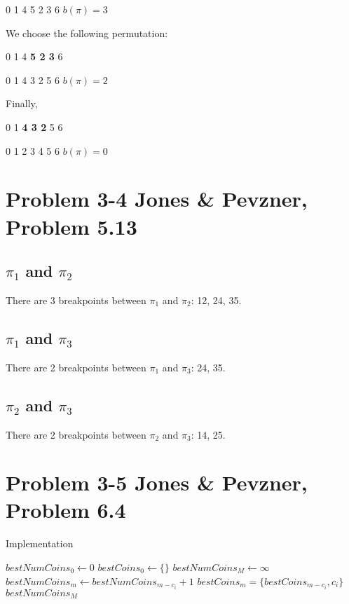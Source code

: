 \documentclass{article}
\begin{document}
\begin{center}
0 1 4 5 2 3 6 $b(\pi) = 3$
\end{center}

We choose the following permutation:

\begin{center}
0 1 4 \textbf{5 2 3} 6

0 1 4 3 2 5 6 $b(\pi) = 2$
\end{center}

Finally,

\begin{center}
0 1 \textbf{4 3 2} 5 6

0 1 2 3 4 5 6 $b(\pi) = 0$
\end{center}

\section*{Problem 3-4 Jones \& Pevzner, Problem 5.13}

\subsection*{$\pi_1$ and $\pi_2$}

There are 3 breakpoints between $\pi_1$ and $\pi_2$: 12, 24, 35.

\subsection*{$\pi_1$ and $\pi_3$}

There are 2 breakpoints between $\pi_1$ and $\pi_3$: 24, 35.

\subsection*{$\pi_2$ and $\pi_3$}

There are 2 breakpoints between $\pi_2$ and $\pi_3$: 14, 25.

\section*{Problem 3-5 Jones \& Pevzner, Problem 6.4}

\begin{algorithm}[H]
\caption{Implementation}
\begin{algorithmic}[1]
 \State $bestNumCoins_0 \leftarrow 0$
 \State $bestCoins_0 \leftarrow \{\}$
 \State $bestNumCoins_M \leftarrow \infty$
     \State $bestNumCoins_m \leftarrow bestNumCoins_{m-c_i} + 1$
     \State $bestCoins_m = \{bestCoins_{m-c_i},c_i\}$
    \EndIf
   \EndIf
  \EndFor
 \EndFor
 \State \Return $bestNumCoins_M$
\EndFunction
\end{algorithmic}
\end{algorithm}
\end{document}
